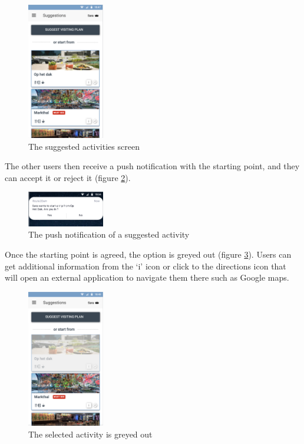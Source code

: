 \documentclass[11pt,a4paper,oneside]{article}
\begin{document}
\begin{figure}[H]
    \centering
    \includegraphics[width=0.3\textwidth]{paper/imgs/hifi_prototypes/results.png}
    \caption{The suggested activities screen}
    \label{fig:results_screen}
\end{figure}

The other users then receive a push notification with the starting point, and they can accept it or reject it (figure \ref{fig:notification_yes_no}).

\begin{figure}[H]
    \centering
    \includegraphics[width=0.3\textwidth]{paper/imgs/hifi_prototypes/push_notification_yes-no.png}
    \caption{The push notification of a suggested activity}
    \label{fig:notification_yes_no}
\end{figure}

Once the starting point is agreed, the option is greyed out (figure \ref{fig:grey_result}). Users can get additional information from the ‘i’ icon or click to the directions icon that will open an external application to navigate them there such as Google maps.

\begin{figure}[H]
    \centering
    \includegraphics[width=0.3\textwidth]{paper/imgs/hifi_prototypes/results_grey.png}
    \caption{The selected activity is greyed out}
    \label{fig:grey_result}
\end{figure}
\end{document}
